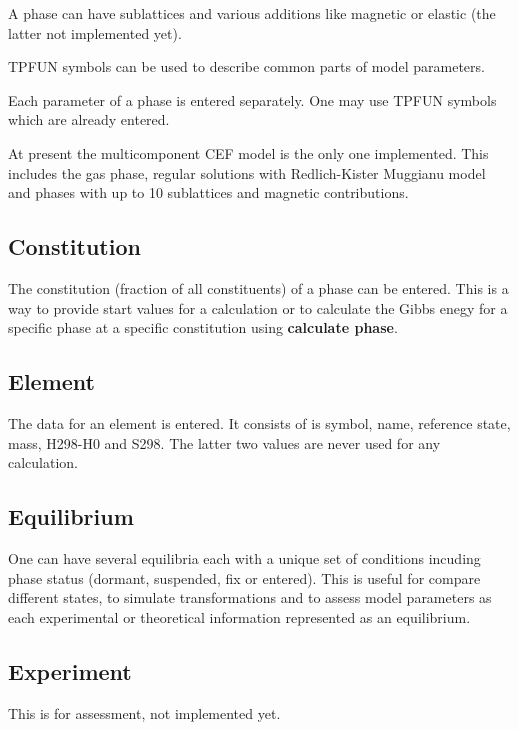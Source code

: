 \documentclass[12pt]{article}
\begin{document}
A phase can have sublattices and various additions like magnetic or
elastic (the latter not implemented yet).  

TPFUN symbols can be used to describe common parts of model
parameters.

Each parameter of a phase is entered separately.  One may use
TPFUN symbols which are already entered.

At present the multicomponent CEF model is the only one implemented.
This includes the gas phase, regular solutions with Redlich-Kister
Muggianu model and phases with up to 10 sublattices and magnetic
contributions.

\subsection{Constitution}

The constitution (fraction of all constituents) of a phase can be
entered.  This is a way to provide start values for a calculation or
to calculate the Gibbs enegy for a specific phase at a specific
constitution using {\bf calculate phase}.

\subsection{Element}

The data for an element is entered.  It consists of is symbol, name,
reference state, mass, H298-H0 and S298.  The latter two values are 
never used for any calculation.

\subsection{Equilibrium}

One can have several equilibria each with a unique set of conditions
incuding phase status (dormant, suspended, fix or entered).  This is
useful for compare different states, to simulate transformations and
to assess model parameters as each experimental or theoretical
information represented as an equilibrium.

\subsection{Experiment}

This is for assessment, not implemented yet.
\end{document}
